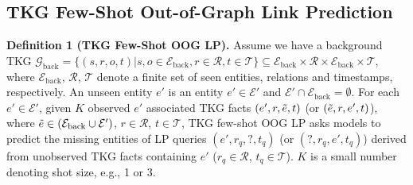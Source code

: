 \documentclass[runningheads]{llncs}
\begin{document}
\subsection{TKG Few-Shot Out-of-Graph Link Prediction}
\textbf{Definition 1 (TKG Few-Shot OOG LP).} Assume we have a background TKG $\mathcal{G}_{\text{back}} = \{(s,r,o,t)|s,o \in \mathcal{E}_{\text{back}}, r \in \mathcal{R}, t \in \mathcal{T}\} \subseteq \mathcal{E}_{\text{back}} \times \mathcal{R} \times \mathcal{E}_{\text{back}} \times \mathcal{T}$, where $\mathcal{E}_{\text{back}}$, $\mathcal{R}$, $\mathcal{T}$ denote a finite set of seen entities, relations and timestamps, respectively. An unseen entity $e'$ is an entity $e' \in \mathcal{E'}$ and $\mathcal{E}' \cap \mathcal{E}_{\text{back}} = \emptyset$. 
For each $e' \in \mathcal{E}'$, given $K$ observed $e'$ associated TKG facts $(e', r, \Tilde{e}, t)$ (or $(\Tilde{e}, r, e', t)$), 
where $\Tilde{e} \in (\mathcal{E}_{\text{back}} \cup \mathcal{E}')$, $r \in \mathcal{R}$, $t \in \mathcal{T}$, 
TKG few-shot OOG LP asks models to predict the missing entities of LP queries $(e', r_q,?, t_q)$ (or $(?, r_q, e', t_q)$) derived from unobserved TKG facts containing $e'$ ($r_q \in \mathcal{R}$, $t_q \in \mathcal{T}$). $K$ is a small number denoting shot size, e.g., 1 or 3. 
\end{document}
